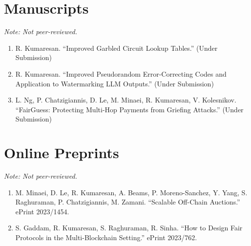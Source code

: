 \documentclass[11pt]{article}
\begin{document}
\section{Manuscripts}
\textit{Note: Not peer-reviewed.}
\begin{enumerate}[leftmargin=*, itemsep=1pt]
    \item R. Kumaresan. ``Improved Garbled Circuit Lookup Tables.'' (Under Submission)
    
    \item R. Kumaresan. ``Improved Pseudorandom Error-Correcting Codes and Application to Watermarking LLM Outputs.'' (Under Submission)
    
    \item L. Ng, P. Chatzigiannis, D. Le, M. Minaei, R. Kumaresan, V. Kolesnikov. ``FairGuess: Protecting Multi-Hop Payments from Griefing Attacks.'' (Under Submission)
\end{enumerate}

\section{Online Preprints}
\textit{Note: Not peer-reviewed.}
\begin{enumerate}[leftmargin=*, itemsep=1pt]
    \item M. Minaei, D. Le, R. Kumaresan, A. Beams, P. Moreno-Sanchez, Y. Yang, S. Raghuraman, P. Chatzigiannis, M. Zamani. ``Scalable Off-Chain Auctions.'' ePrint 2023/1454.
    
    \item S. Gaddam, R. Kumaresan, S. Raghuraman, R. Sinha. ``How to Design Fair Protocols in the Multi-Blockchain Setting.'' ePrint 2023/762.
\end{enumerate}

\end{document}

